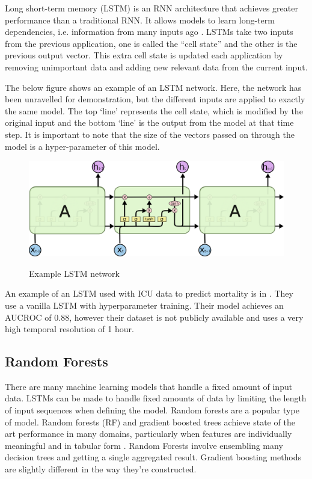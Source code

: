\documentclass[12pt]{article}
\begin{document}
Long short-term memory (LSTM) is an RNN architecture that achieves greater performance than a traditional RNN. It allows models to learn long-term dependencies, i.e. information from many inputs ago \cite{ColahLSTM}. LSTMs take two inputs from the previous application, one is called the ``cell state'' and the other is the previous output vector. This extra cell state is updated each application by removing unimportant data and adding new relevant data from the current input. 

The below figure shows an example of an LSTM network. Here, the network has been unravelled for demonstration, but the different inputs are applied to exactly the same  model. The top `line' represents the cell state, which is modified by the original input and the bottom `line' is the output from the model at that time step. It is important to note that the size of the vectors passed on through the model is a hyper-parameter of this model.

\begin{figure}[H]
\centering\caption{Example LSTM network \cite{ColahLSTM}}
\includegraphics[scale=0.5]{LSTM3-chain.png}
\label{Example LSTM}
\end{figure}

An example of an LSTM used with ICU data to predict mortality is in \cite{ICUFancyLSTM}. They use a vanilla LSTM with hyperparameter training. Their model achieves an AUCROC of 0.88, however their dataset is not publicly available and uses a very high temporal resolution of 1 hour.

\subsection{Random Forests}
There are many machine learning models that handle a fixed amount of input data. LSTMs can be made to handle fixed amounts of data by limiting the length of input sequences when defining the model. 
Random forests are a popular type of model. Random forests (RF) and gradient boosted trees achieve state of the art performance in many domains, particularly when features are individually meaningful and in tabular form \cite{TreeExplainer}. Random Forests involve ensembling many decision trees and getting a single aggregated result. Gradient boosting methods are slightly different in the way they're constructed.
\end{document}
